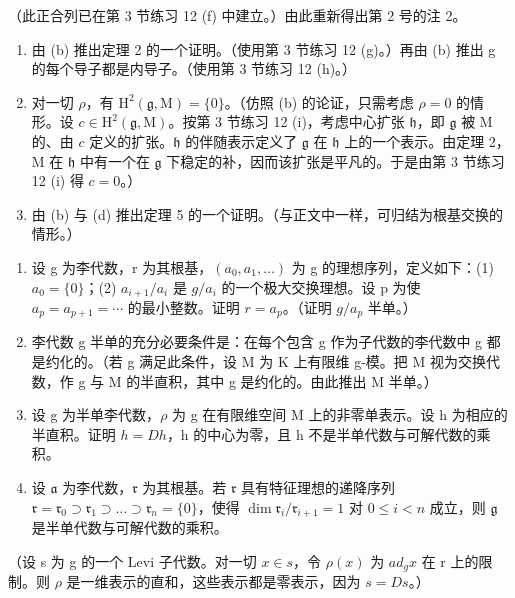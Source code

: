 （此正合列已在第 3 节练习 12 (f) 中建立。）由此重新得出第 2 号的注 2。

\begin{enumerate}
\def\labelenumi{(\alph{enumi})}
\setcounter{enumi}{2}
\item
  由 (b) 推出定理 2 的一个证明。（使用第 3 节练习 12 (g)。）再由 (b) 推出 g 的每个导子都是内导子。（使用第 3 节练习 12 (h)。）
\item
  对一切 \(\rho\)，有 \(\mathrm{H}^2(\mathfrak{g}, \mathrm{M}) = \{0\}\)。（仿照 (b) 的论证，只需考虑 \(\rho = 0\) 的情形。设 \(c \in \mathrm{H}^2(\mathfrak{g}, \mathrm{M})\)。按第 3 节练习 12 (i)，考虑中心扩张 \(\mathfrak{h}\)，即 \(\mathfrak{g}\) 被 \(\mathrm{M}\) 的、由 \(c\) 定义的扩张。\(\mathfrak{h}\) 的伴随表示定义了 \(\mathfrak{g}\) 在 \(\mathfrak{h}\) 上的一个表示。由定理 2，\(\mathrm{M}\) 在 \(\mathfrak{h}\) 中有一个在 \(\mathfrak{g}\) 下稳定的补，因而该扩张是平凡的。于是由第 3 节练习 12 (i) 得 \(c = 0\)。）
\item
  由 (b) 与 (d) 推出定理 5 的一个证明。（与正文中一样，可归结为根基交换的情形。）
\end{enumerate}

\begin{enumerate}
\def\labelenumi{\arabic{enumi}.}
\setcounter{enumi}{1}
\item
  设 g 为李代数，r 为其根基，\((a_{0}, a_{1}, \ldots)\) 为 g 的理想序列，定义如下：(1) \(a_{0} = \{0\}\)；(2) \(a_{i+1}/a_{i}\) 是 \(g/a_{i}\) 的一个极大交换理想。设 p 为使 \(a_{p} = a_{p+1} = \cdots\) 的最小整数。证明 \(r = a_{p}\)。（证明 \(g/a_{p}\) 半单。）
\item
  李代数 g 半单的充分必要条件是：在每个包含 g 作为子代数的李代数中 g 都是约化的。（若 g 满足此条件，设 M 为 K 上有限维 g-模。把 M 视为交换代数，作 g 与 M 的半直积，其中 g 是约化的。由此推出 M 半单。）
\item
  设 g 为半单李代数，\(\rho\) 为 g 在有限维空间 M 上的非零单表示。设 h 为相应的半直积。证明 \(h = Dh\)，h 的中心为零，且 h 不是半单代数与可解代数的乘积。
\item
  设 \(\mathfrak{a}\) 为李代数，\(\mathfrak{r}\) 为其根基。若 \(\mathfrak{r}\) 具有特征理想的递降序列 \(\mathfrak{r} = \mathfrak{r}_0 \supset \mathfrak{r}_1 \supset \dots \supset \mathfrak{r}_n = \{0\}\)，使得 \(\dim \mathfrak{r}_i / \mathfrak{r}_{i+1} = 1\) 对 \(0 \leqslant i < n\) 成立，则 \(\mathfrak{g}\) 是半单代数与可解代数的乘积。
\end{enumerate}

（设 s 为 g 的一个 Levi 子代数。对一切 \(x \in s\)，令 \(\rho(x)\) 为 \(ad_{g}x\) 在 r 上的限制。则 \(\rho\) 是一维表示的直和，这些表示都是零表示，因为 \(s = Ds\)。）

